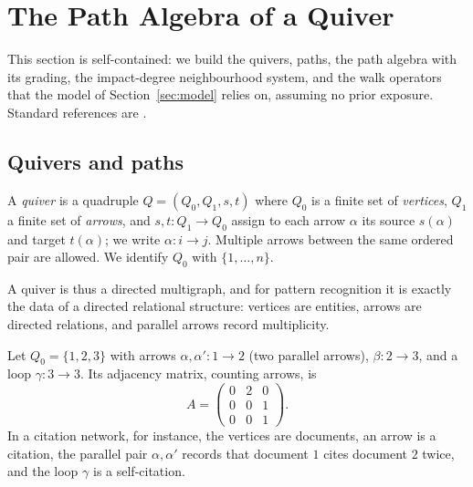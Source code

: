 \documentclass[runningheads]{llncs}
\newcommand{\Adj}{A}
\begin{document}
\section{The Path Algebra of a Quiver}\label{sec:algebra}

This section is self-contained: we build the quivers, paths, the path algebra
with its grading, the impact-degree neighbourhood system, and the walk
operators that the model of Section~\ref{sec:model} relies on, assuming no
prior exposure. Standard references are
\cite{schiffler2014quiver,assem2006elements}.

\subsection{Quivers and paths}

\begin{definition}
A \emph{quiver} is a quadruple $Q=(Q_0,Q_1,s,t)$ where $Q_0$ is a finite set of
\emph{vertices}, $Q_1$ a finite set of \emph{arrows}, and $s,t\colon Q_1\to
Q_0$ assign to each arrow $\alpha$ its source $s(\alpha)$ and target
$t(\alpha)$; we write $\alpha\colon i\to j$. Multiple arrows between the same
ordered pair are allowed. We identify $Q_0$ with $\{1,\dots,n\}$.
\end{definition}

A quiver is thus a directed multigraph, and for pattern recognition it is
exactly the data of a directed relational structure: vertices are entities,
arrows are directed relations, and parallel arrows record multiplicity.

\begin{example}\label{ex:firstquiver}
Let $Q_0=\{1,2,3\}$ with arrows $\alpha,\alpha'\colon 1\to 2$ (two parallel
arrows), $\beta\colon 2\to 3$, and a loop $\gamma\colon 3\to 3$. Its adjacency
matrix, counting arrows, is
\[
  \Adj=\begin{pmatrix}0&2&0\\0&0&1\\0&0&1\end{pmatrix}.
\]
In a citation network, for instance, the vertices are documents, an arrow is a
citation, the parallel pair $\alpha,\alpha'$ records that document $1$ cites
document $2$ twice, and the loop $\gamma$ is a self-citation.
\end{example}
\end{document}
